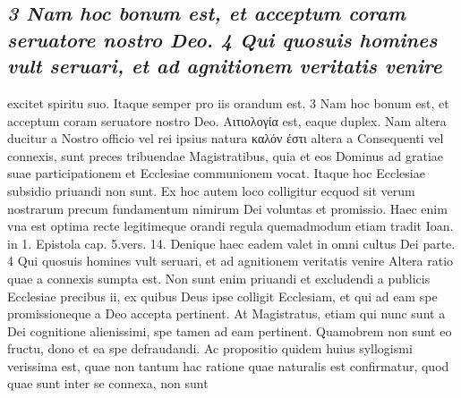 \documentclass{article}
\begin{document}
\begin{pages}
\subsection*{\textit{3 Nam hoc bonum est, et acceptum coram seruatore nostro Deo. 4 Qui quosuis homines vult seruari, et ad agnitionem veritatis venire}}excitet spiritu suo. Itaque semper pro iis orandum est. 3 Nam hoc bonum est, et acceptum coram seruatore nostro Deo. Αιτιολογία est, eaque duplex. Nam altera ducitur a Nostro officio vel rei ipsius natura καλόν ἐστι altera a Consequenti vel connexis, sunt preces tribuendae Magistratibus, quia et eos Dominus ad gratiae suae participationem et Ecclesiae communionem vocat. Itaque hoc Ecclesiae subsidio priuandi non sunt. Ex hoc autem loco colligitur ecquod sit verum nostrarum precum fundamentum nimirum Dei voluntas et promissio. Haec enim vna est optima recte legitimeque orandi regula quemadmodum etiam tradit Ioan. in 1. Epistola cap. 5.vers. 14. Denique haec eadem valet in omni cultus Dei parte. 4 Qui quosuis homines vult seruari, et ad agnitionem veritatis venire Altera ratio quae a connexis sumpta est. Non sunt enim priuandi et excludendi a publicis Ecclesiae precibus ii, ex quibus Deus ipse colligit Ecclesiam, et qui ad eam spe promissioneque a Deo accepta pertinent. At Magistratus, etiam qui nunc sunt a Dei cognitione alienissimi, spe tamen ad eam pertinent. Quamobrem non sunt eo fructu, dono et ea spe defraudandi. Ac propositio quidem huius syllogismi verissima est, quae non tantum hac ratione quae naturalis est confirmatur, quod quae sunt inter se connexa, non sunt  \pend

\end{pages}
\end{document}
